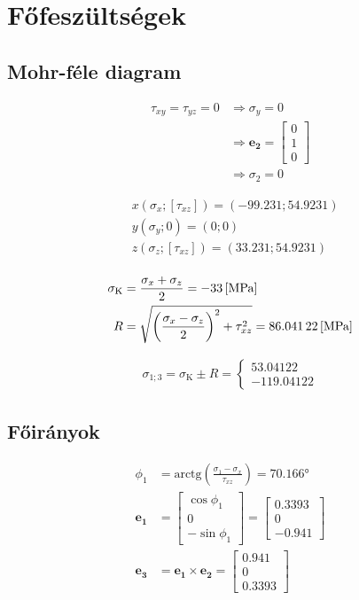 \section{Főfeszültségek}

\subsection{Mohr-féle diagram}

\begin{align*}
	\tau_{xy} = \tau_{yz} = 0 &\Rightarrow \sigma_y = 0 \\
				  &\Rightarrow \pmb{e_2} = \begin{bmatrix}
		0 \\
		1 \\
		0
	\end{bmatrix} \\ 
				  &\Rightarrow \sigma_2 = 0
\end{align*}

\begin{align*}
	&x(\sigma_x; \left[\tau_{xz}\right]) = (-99.231; 54.9231) \\
    	&y(\sigma_y; 0) = (0; 0) \\
	&z(\sigma_z; \left[\tau_{xz}\right]) = (33.231; 54.9231) \\
\end{align*}

\begin{align*}
	\sigma_\text{K} &= \frac{\sigma_x + \sigma_z}{2} = \SI{-33}{[\mega\pascal]} \\
	R &= \sqrt{\left(\frac{\sigma_x - \sigma_z}{2}\right)^2 + \tau_{xz}^2} = \SI{86.04122}{[\mega\pascal]}
\end{align*}

\begin{align*}
	\sigma_{1;3} = \sigma_\text{K} \pm R = \begin{cases}
		53.04122 \\
		-119.04122
	\end{cases}
\end{align*}

\subsection{Főirányok}
\begin{align*}
	\phi_1 &= \text{arctg}(\frac{\sigma_1 - \sigma_x}{\tau_{xz}}) = \ang{70.166} \\
	\pmb{e_1} &= \begin{bmatrix}
		\cos \phi_1 \\
		0 \\
		-\sin \phi_1
		\end{bmatrix} = \begin{bmatrix}
			0.3393 \\
			0 \\
			-0.941
		\end{bmatrix} \\
	\pmb{e_3} &= \pmb{e_1} \times \pmb{e_2} = \begin{bmatrix}
		0.941 \\
		0 \\
		0.3393
	\end{bmatrix}
\end{align*}

